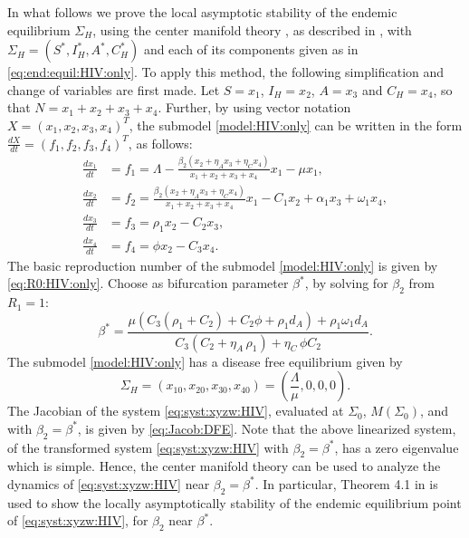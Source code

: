 \documentclass{my_aims}
\theoremstyle{definition}
\begin{document}
In what follows we prove the local asymptotic stability of the endemic equilibrium
$\Sigma_H$, using the center manifold theory \cite{Carr:1981},
as described in \cite[Theorem~4.1]{CChavez_Song_2004}, with
$\Sigma_H = (S^*, I_H^*, A^*, C_H^*)$ and each of its components given as in \eqref{eq:end:equil:HIV:only}.
To apply this method, the following simplification and change of variables are first made.
Let $S = x_1$, $I_H = x_2$, $A = x_3$ and $C_H = x_4$, so that $N = x_1 + x_2 +x_3 + x_4$.
Further, by using vector notation $X = (x_1, x_2, x_3, x_4)^T$, the submodel \eqref{model:HIV:only}
can be written in the form $\frac{dX}{dt} = (f_1, f_2, f_3, f_4)^T$, as follows:
\begin{equation}
\label{eq:syst:xyzw:HIV}
\begin{split}
\frac{dx_1}{dt} &= f_1 = \Lambda - \frac{\beta_2 \left(x_2 + \eta_A x_3
+ \eta_C x_4  \right)}{x_1 + x_2 +x_3 + x_4} x_1 - \mu x_1,\\[0.2 cm]
\frac{dx_2}{dt} &= f_2 = \frac{\beta_2
\left(x_2 + \eta_A x_3 + \eta_C x_4  \right)}{x_1 + x_2 +x_3 + x_4}
x_1 - C_1 x_2 + \alpha_1 x_3  + \omega_1 x_4,\\[0.2 cm]
\frac{dx_3}{dt} &= f_3 = \rho_1 x_2 - C_2 x_3, \\[0.2 cm]
\frac{dx_4}{dt} &= f_4 = \phi x_2 - C_3 x_4.
\end{split}
\end{equation}
The basic reproduction number of the submodel \eqref{model:HIV:only}
is given by \eqref{eq:R0:HIV:only}. Choose as bifurcation parameter
$\beta^*$, by solving for $\beta_2$ from $R_1 = 1$:
\begin{equation*}
\beta^* = \frac{ \mu \left(C_3(\rho_1 + C_2) + C_2 \phi + \rho_1 d_A \right)
+ \rho_1 \omega_1 d_A }{ C_3(C_2 +{\eta_A}\,{\rho_1}) +{\eta_C}\,\phi C_2  }.
\end{equation*}
The submodel \eqref{model:HIV:only} has a disease free equilibrium given by
\begin{equation*}
\Sigma_{H} = (x_{10}, x_{20}, x_{30}, x_{40}) = \left(\frac{\Lambda}{\mu},0, 0,0  \right).
\end{equation*}
The Jacobian of the system \eqref{eq:syst:xyzw:HIV}, evaluated at
$\Sigma_{0}$, $M\left( \Sigma_0 \right)$, and with
$\beta_2 = \beta^*$, is given by \eqref{eq:Jacob:DFE}.
Note that the above linearized system, of the transformed system \eqref{eq:syst:xyzw:HIV}
with $\beta_2 = \beta^*$, has a zero eigenvalue which is simple.
Hence, the center manifold theory \cite{Carr:1981} can be used to analyze the dynamics
of \eqref{eq:syst:xyzw:HIV} near $\beta_2 = \beta^*$. In particular,
Theorem 4.1 in \cite{CChavez_Song_2004} is used to show the locally
asymptotically stability of the endemic equilibrium point
of \eqref{eq:syst:xyzw:HIV}, for $\beta_2$ near $\beta^*$.
\end{document}
